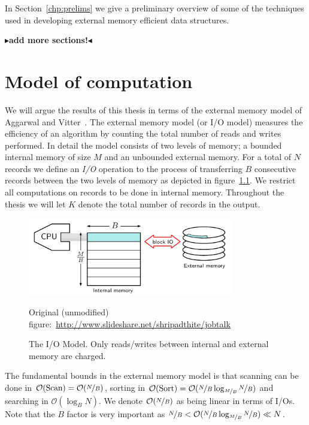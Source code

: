 \documentclass[twoside,11pt,openright]{report}
\newcommand{\todo}[1]{{\color[rgb]{.5,0,0}\textbf{$\blacktriangleright$#1$\blacktriangleleft$}}}
\begin{document}
In Section~\ref{chp:prelims} we give a preliminary overview of some of the techniques used in developing external memory efficient data structures.

\todo{add more sections!}

\chapter{Model of computation}
\label{chp:iomodel}
We will argue the results of this thesis in terms of the external memory model of Aggarwal and Vitter~\cite{Aggarwal:1988/ICS/48529.48535}.
The external memory model (or I/O model) measures the efficiency of an algorithm by counting the total number of reads and writes performed. In detail the model consists of two levels of memory; a bounded internal memory of size $M$ and an unbounded external memory. For a total of $N$ records we define an \textit{I/O} operation to the process of transferring $B$ consecutive records between the two levels of memory as depicted in figure~\ref{fig:io_model}. We restrict all computations on records to be done in internal memory. Throughout the thesis we will let $K$ denote the total number of records in the output.

\begin{figure}[h]
	\centering
	\includegraphics[width=0.8\textwidth]{../figures/io_model2.png}
	\caption{The I/O Model. Only reads/writes between internal and external memory are charged.}
	\tiny{Original (unmodified) figure:~\protect\url{http://www.slideshare.net/shripadthite/jobtalk}}
	\label{fig:io_model}
\end{figure}

The fundamental bounds in the external memory model is that scanning can be done in $\mathcal{O}(\text{Scan}) = \mathcal{O}(\nicefrac{N}{B})$, sorting in $\mathcal{O}(\text{Sort}) = \mathcal{O}(\nicefrac{N}{B} \log_{\nicefrac{M}{B}}\nicefrac{N}{B})$ and searching in $\mathcal{O}(\log_B N)$. We denote $\mathcal{O}(\nicefrac{N}{B})$ as being linear in terms of I/Os. Note that the $B$ factor is very important as $\nicefrac{N}{B} < \mathcal{O}(\nicefrac{N}{B} \log_{\nicefrac{M}{B}}\nicefrac{N}{B}) \ll N$.
\end{document}
